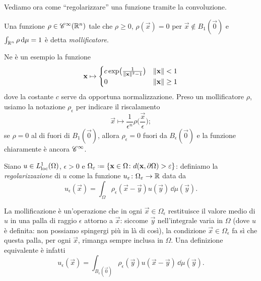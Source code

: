 Vediamo ora come ``regolarizzare'' una funzione tramite la convoluzione.
\begin{definizione} \label{d:mollificatore}
    Una funzione $\rho\in\cont[\infty]{\R^n}$ tale che $\rho\ge 0$, $\rho(\vec x)=0$ per $\vec x\notin B_1(\vec 0)$ e $\int_{\R^n}\rho\,\dd\mu=1$ è detta \emph{mollificatore}.
\end{definizione}
Ne è un esempio la funzione
\begin{equation*}
    \vec x\mapsto
    \begin{cases}
        c\exp\bigl(\frac1{\norm{\vec x}^2-1}\bigr)    & \norm{\vec x}<1 \\
        0                                             & \norm{\vec x}\ge 1
    \end{cases}
\end{equation*}
dove la costante $c$ serve da opportuna normalizzazione.
Preso un mollificatore $\rho$, usiamo la notazione $\rho_\epsilon$ per indicare il riscalamento
\begin{equation}
    \vec x\mapsto\frac1{\epsilon^n}\rho\biggl(\frac{\vec x}{\epsilon}\biggr);
\end{equation}
se $\rho=0$ al di fuori di $B_1(\vec 0)$, allora $\rho_\epsilon=0$ fuori da $B_\epsilon(\vec 0)$ e la funzione chiaramente è ancora $\cclass[\infty]$.
\begin{definizione} \label{d:regolarizzazione}
    Siano $u\in\locleb[1]{\Omega}$, $\epsilon>0$ e $\Omega_\epsilon\defeq\{\vec x\in\Omega\colon d(\vec x,\boundary\Omega)>\epsilon\}$: definiamo la \emph{regolarizzazione} di $u$ come la funzione $u_\epsilon\colon\Omega_\epsilon\to\R$ data da
    \begin{equation}
        u_\epsilon(\vec x)=
        \int_\Omega\rho_\epsilon(\vec x-\vec y)u(\vec y)\,\dd\mu(\vec y).
        \label{eq:regolarizzazione}
    \end{equation}
\end{definizione}
La mollificazione è un'operazione che in ogni $\vec x\in\Omega_\epsilon$ restituisce il valore medio di $u$ in una palla di raggio $\epsilon$ attorno a $\vec x$: siccome $\vec y$ nell'integrale varia in $\Omega$ (dove $u$ è definita: non possiamo spingergi più in là di cos\`i), la condizione $\vec x\in\Omega_\epsilon$ fa s\`i che questa palla, per ogni $\vec x$, rimanga sempre inclusa in $\Omega$.
Una definizione equivalente è infatti
\begin{equation}
    u_\epsilon(\vec x)=
    \int_{B_\epsilon(\vec 0)}\rho_\epsilon(\vec y)u(\vec x-\vec y)\,\dd\mu(\vec y).
\end{equation}

